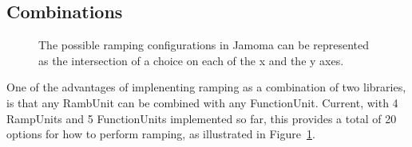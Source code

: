 \documentclass{article}
\begin{document}



\subsection{Combinations} %
\label{sec:combinations}

\begin{figure}
\centerline{}
\caption{The possible ramping configurations in Jamoma can be represented as the intersection of a choice on each of the x and the y axes.}
\label{fig:combinations}
\end{figure}

One of the advantages of implenenting ramping as a combination of two libraries, is that any RambUnit can be combined with any FunctionUnit. Current, with 4 RampUnits and 5 FunctionUnits implemented so far, this provides a total of 20 options for how to perform ramping, as illustrated in Figure~\ref{fig:combinations}.
\end{document}
